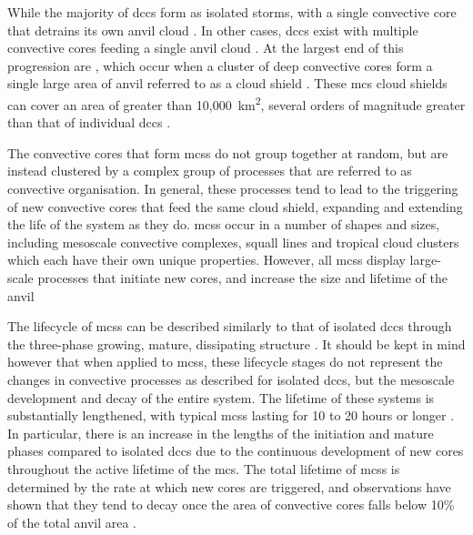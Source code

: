 While the majority of \acrshort{dcc}s form as isolated storms, with a single convective core that detrains its own anvil cloud \citep{riehl_northeast_1951}.
In other cases, \acrshort{dcc}s exist with multiple convective cores feeding a single anvil cloud \citep{zipser_role_1969, nakazawa_tropical_1988}.
At the largest end of this progression are , which occur when a cluster of deep convective cores form a single large area of anvil referred to as a cloud shield \citep{roca_simple_2017}.
These \acrshort{mcs} cloud shields can cover an area of greater than 10,000~km\textsuperscript{2}, several orders of magnitude greater than that of individual \acrshort{dcc}s \citep{houze_mesoscale_2004}.

The convective cores that form \acrshort{mcs}s do not group together at random, but are instead clustered by a complex group of processes that are referred to as convective organisation.
In general, these processes tend to lead to the triggering of new convective cores that feed the same cloud shield, expanding and extending the life of the system as they do.
\acrshort{mcs}s occur in a number of shapes and sizes, including mesoscale convective complexes, squall lines and tropical cloud clusters \citep{tsakraklides_global_2003a} which each have their own unique properties.
However, all \acrshort{mcs}s display large-scale processes that initiate new cores, and increase the size and lifetime of the anvil

The lifecycle of \acrshort{mcs}s can be described similarly to that of isolated \acrshort{dcc}s through the three-phase growing, mature, dissipating structure \citep{futyan_deep_2007}.
It should be kept in mind however that when applied to \acrshort{mcs}s, these lifecycle stages do not represent the changes in convective processes as described for isolated \acrshort{dcc}s, but the mesoscale development and decay of the entire system.
The lifetime of these systems is substantially lengthened, with typical \acrshort{mcs}s lasting for 10 to 20 hours or longer \citep{chen_diurnal_1997}.
In particular, there is an increase in the lengths of the initiation and mature phases compared to isolated \acrshort{dcc}s \citep{wall_life_2018} due to the continuous development of new cores throughout the active lifetime of the \acrshort{mcs}.
The total lifetime of \acrshort{mcs}s is determined by the rate at which new cores are triggered, and observations have shown that they tend to decay once the area of convective cores falls below 10\% of the total anvil area \citep{elsaesser_simple_2022}.

